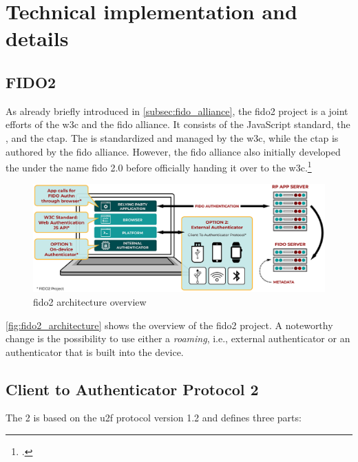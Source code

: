 \section{Technical implementation and details}

\subsection{FIDO2}

As already briefly introduced in \autoref{subsec:fido_alliance}, the \gls{fido}2 project is a joint efforts of the \gls{w3c} and the \gls{fido} alliance. It consists of the JavaScript standard, the \wa{}, and the \gls{ctap}. The \wa{} is standardized and managed by the \gls{w3c}, while the \gls{ctap} is authored by the \gls{fido} alliance. However, the \gls{fido} alliance also initially developed the \wa{} under the name \gls{fido} 2.0 before officially handing it over to the \gls{w3c}.\footcites[See][254]{Schwartz2018}[See][3]{FormalVerificationWebAuthn}

\begin{figure}[hbt]
	\centering
	\includegraphics[width=\textwidth]{pics/FIDO2-Graphic-v2.eps}
	\caption[\gls{fido}2 architecture overview]{\gls{fido}2 architecture overview\footnotemark}
	\label{fig:fido2_architecture}
\end{figure}

\autoref{fig:fido2_architecture} shows the overview of the \gls{fido}2 project. A noteworthy change is the possibility to use either a \textit{roaming}, i.e., external authenticator or an authenticator that is built into the device.

\subsection{Client to Authenticator Protocol 2}

The  2 is based on the \gls{u2f} protocol version 1.2 and defines three parts:

